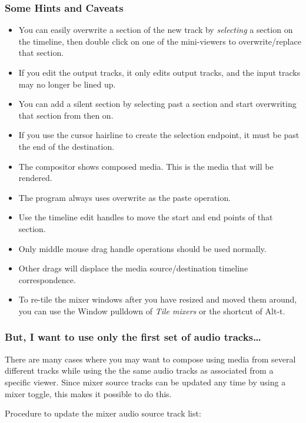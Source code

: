 \subsubsection*{Some Hints and Caveats}%
\label{ssub:hints_caveats}

\begin{itemize}
	\item You can easily overwrite a section of the new track by \textit{selecting} a section on the timeline, then double click on one of the mini-viewers to overwrite/replace that section.
	\item If you edit the output tracks, it only edits output tracks, and the input tracks may no longer be lined up.
	\item You can add a silent section by selecting past a section and start overwriting that section from then on.
	\item If you use the cursor hairline to create the selection endpoint, it must be past the end of the destination.
	\item The compositor shows composed media.  This is the media that will be rendered.
	\item The program always uses overwrite as the paste operation.
	\item Use the timeline edit handles to move the start and end points of that section.
	\item Only middle mouse drag handle operations should be used normally.
	\item Other drags will displace the media source/destination timeline correspondence.
	\item To re-tile the mixer windows after you have resized and moved them around, you can use the Window
	pulldown of \textit{Tile mixers} or the shortcut of Alt-t.
\end{itemize}

\subsubsection*{But, I want to use only the first set of audio tracks\dots}%
\label{ssub:but_use_only_first_audio}

There are many cases where you may want to compose using media from several different tracks while using the the same audio tracks as associated from a specific viewer.  Since mixer source tracks can be updated any time by using a mixer toggle, this makes it possible to do this.  

Procedure to update the mixer audio source track list:

